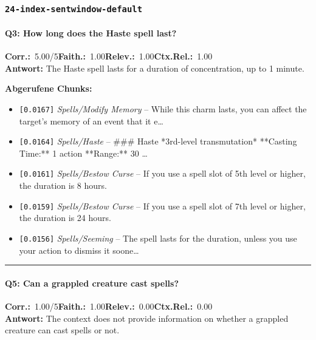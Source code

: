 \subsubsection*{\texttt{24-index-sentwindow-default}}
\label{app:samples:24_index_sentwindow_default}

\paragraph{Q3: How long does the Haste spell last?}
\noindent \textbf{Corr.:}~5.00/5\quad \textbf{Faith.:}~1.00\quad \textbf{Relev.:}~1.00\quad \textbf{Ctx.Rel.:}~1.00\\

\noindent\textbf{Antwort:} The Haste spell lasts for a duration of concentration, up to 1 minute.

\noindent\textbf{Abgerufene Chunks:}
\begin{itemize}[noitemsep, topsep=2pt]
  \item[\textbf{\#1}] \texttt{[0.0167]} \textit{Spells/Modify Memory} -- While this charm lasts, you can affect the target's memory of an event that it e\ldots
  \item[\textbf{\#2}] \texttt{[0.0164]} \textit{Spells/Haste} -- \#\#\# Haste  *3rd-level transmutation*  **Casting Time:** 1 action  **Range:** 30 \ldots
  \item[\textbf{\#3}] \texttt{[0.0161]} \textit{Spells/Bestow Curse} -- If you use a spell slot of 5th level or higher, the duration is 8 hours.
  \item[\textbf{\#4}] \texttt{[0.0159]} \textit{Spells/Bestow Curse} -- If you use a spell slot of 7th level or higher, the duration is 24 hours.
  \item[\textbf{\#5}] \texttt{[0.0156]} \textit{Spells/Seeming} -- The spell lasts for the duration, unless you use your action to dismiss it soone\ldots
\end{itemize}
\vspace{4pt}
\hrule
\vspace{6pt}

\paragraph{Q5: Can a grappled creature cast spells?}
\noindent \textbf{Corr.:}~1.00/5\quad \textbf{Faith.:}~1.00\quad \textbf{Relev.:}~0.00\quad \textbf{Ctx.Rel.:}~0.00\\

\noindent\textbf{Antwort:} The context does not provide information on whether a grappled creature can cast spells or not.

